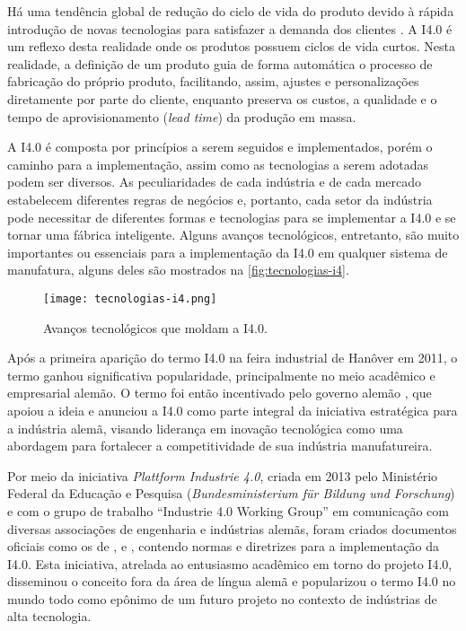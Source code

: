 Há uma tendência global de redução do ciclo de vida do produto devido à rápida introdução de novas tecnologias para satisfazer a demanda dos clientes \cite{trappey2008lifecycle}. A I4.0 é um reflexo desta realidade onde os produtos possuem ciclos de vida curtos. Nesta realidade, a definição de um produto guia de forma automática o processo de fabricação do próprio produto, facilitando, assim, ajustes e personalizações diretamente por parte do cliente, enquanto preserva os custos, a qualidade e o tempo de aprovisionamento (\textit{lead time}) da produção em massa.

A I4.0 é composta por princípios a serem seguidos e implementados, porém o caminho para a implementação, assim como as tecnologias a serem adotadas podem ser diversos. As peculiaridades de cada indústria e de cada mercado estabelecem diferentes regras de negócios e, portanto, cada setor da indústria pode necessitar de diferentes formas e tecnologias para se implementar a I4.0 e se tornar uma fábrica inteligente. Alguns avanços tecnológicos, entretanto, são muito importantes ou essenciais para a implementação da I4.0 em qualquer sistema de manufatura, alguns deles são mostrados na \autoref{fig:tecnologias-i4}.

\begin{figure}[htb]
	\centering
	\texttt{[image: tecnologias-i4.png]}
	\caption{Avanços tecnológicos que moldam a I4.0.}
	\label{fig:tecnologias-i4}
\end{figure}

Após a primeira aparição do termo I4.0 na feira industrial de Hanôver em 2011, o termo ganhou significativa popularidade, principalmente no meio acadêmico e empresarial alemão. O termo foi então incentivado pelo governo alemão \cite{lasi2014industryfour, kagermann2013recommendations}, que apoiou a ideia e anunciou a I4.0 como parte integral da iniciativa estratégica para a indústria alemã, visando liderança em inovação tecnológica \cite{drath2014industrie} como uma abordagem para fortalecer a competitividade de sua indústria manufatureira.

Por meio da iniciativa \textit{Plattform Industrie 4.0}, criada em 2013 pelo Ministério Federal da Educação e Pesquisa (\textit{Bundesministerium für Bildung und Forschung}) \cite{hartmut2019plattform} e com o grupo de trabalho ``Industrie 4.0 Working Group'' em comunicação com diversas associações de engenharia e indústrias alemãs, foram criados documentos oficiais como os de ,  e , contendo normas e diretrizes para a implementação da I4.0. Esta iniciativa, atrelada ao entusiasmo acadêmico em torno do projeto I4.0, disseminou o conceito fora da área de língua alemã e popularizou o termo I4.0 no mundo todo como epônimo de um futuro projeto no contexto de indústrias de alta tecnologia.

